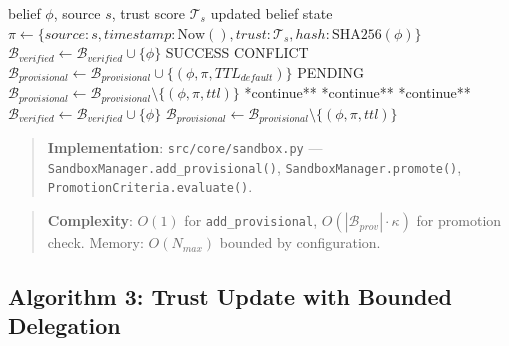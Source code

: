 \documentclass[
]{article}
\begin{document}
\begin{algorithm}
\caption{Belief Sandbox Operations}
\label{alg:sandbox-impl}
\begin{algorithmic}[1]
\Require belief $\phi$, source $s$, trust score $\mathcal{T}_s$
\Ensure updated belief state
  \State $\pi \gets \{source: s, timestamp: \text{Now}(), trust: \mathcal{T}_s, hash: \text{SHA256}(\phi)\}$
      \State $\mathcal{B}_{verified} \gets \mathcal{B}_{verified} \cup \{\phi\}$
      \Return SUCCESS
    \Else
      \Return CONFLICT
    \EndIf
  \Else
    \State $\mathcal{B}_{provisional} \gets \mathcal{B}_{provisional} \cup \{(\phi, \pi, TTL_{default})\}$
    \Return PENDING
  \EndIf
\EndFunction
{}
      \State $\mathcal{B}_{provisional} \gets \mathcal{B}_{provisional} \setminus \{(\phi, \pi, ttl)\}$
      \State **continue**
    \EndIf
      \State **continue**
    \EndIf
      \State **continue**
    \EndIf
      \State $\mathcal{B}_{verified} \gets \mathcal{B}_{verified} \cup \{\phi\}$
      \State $\mathcal{B}_{provisional} \gets \mathcal{B}_{provisional} \setminus \{(\phi, \pi, ttl)\}$
    \EndIf
  \EndFor
\EndFunction
\end{algorithmic}
\end{algorithm}

\begin{quote}
\textbf{Implementation}: \texttt{src/core/sandbox.py} ---
\texttt{SandboxManager.add\_provisional()},
\texttt{SandboxManager.promote()},
\texttt{PromotionCriteria.evaluate()}.
\end{quote}

\begin{quote}
\textbf{Complexity}: \(O(1)\) for \texttt{add\_provisional},
\(O(|\mathcal{B}_{prov}| \cdot \kappa)\) for promotion check. Memory:
\(O(N_{max})\) bounded by configuration.
\end{quote}

\subsection{Algorithm 3: Trust Update with Bounded
Delegation}\label{sec:alg-trust}
\end{document}
